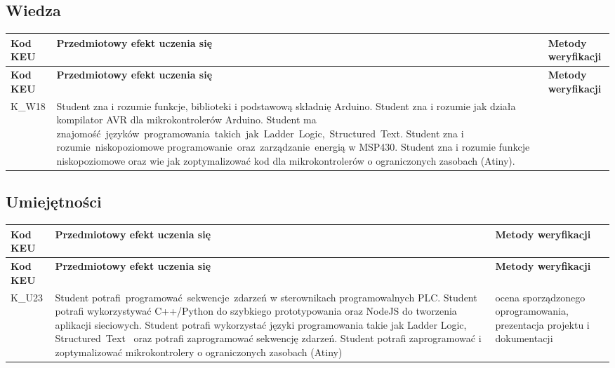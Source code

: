 \documentclass[12pt, a4paper]{article}
\newcommand{\thdrule}{\noalign{\global\setlength{\extrarowheight}{0pt}}}
\newcommand{\thdend}{\noalign{\global\setlength{\extrarowheight}{3pt}}}
\begin{document}
\subsection*{Wiedza}
{\scriptsize
\begin{longtable}{m{1.6cm}m{9.0cm}m{4.2cm}}
\thdrule\toprule
\rowcolor{pjatkRed} {\color{white}\footnotesize\textbf{\vphantom{Ag}Kod KEU}} & {\color{white}\footnotesize\textbf{\vphantom{Ag}Przedmiotowy efekt uczenia się}} & {\color{white}\footnotesize\textbf{\vphantom{Ag}Metody weryfikacji}} \\
\midrule\thdend
\endfirsthead
\thdrule\toprule
\rowcolor{pjatkRed} {\color{white}\footnotesize\textbf{\vphantom{Ag}Kod KEU}} & {\color{white}\footnotesize\textbf{\vphantom{Ag}Przedmiotowy efekt uczenia się}} & {\color{white}\footnotesize\textbf{\vphantom{Ag}Metody weryfikacji}} \\
\midrule\thdend
\endhead
  \rowcolor{tableRowLight} K\_W18 & Student zna i rozumie funkcje, biblioteki i podstawową składnię Arduino.  Student zna i rozumie jak działa kompilator AVR dla mikrokontrolerów Arduino. Student ma znajomość języków programowania takich jak Ladder Logic, Structured Text. Student zna i rozumie niskopoziomowe programowanie oraz zarządzanie energią w MSP430. Student zna i rozumie funkcje niskopoziomowe oraz wie jak zoptymalizować kod dla mikrokontrolerów o ograniczonych zasobach (Atiny). &  \\
\bottomrule
\end{longtable}}

\subsection*{Umiejętności}
{\scriptsize
\begin{longtable}{m{1.6cm}m{9.0cm}m{4.2cm}}
\thdrule\toprule
\rowcolor{pjatkRed} {\color{white}\footnotesize\textbf{\vphantom{Ag}Kod KEU}} & {\color{white}\footnotesize\textbf{\vphantom{Ag}Przedmiotowy efekt uczenia się}} & {\color{white}\footnotesize\textbf{\vphantom{Ag}Metody weryfikacji}} \\
\midrule\thdend
\endfirsthead
\thdrule\toprule
\rowcolor{pjatkRed} {\color{white}\footnotesize\textbf{\vphantom{Ag}Kod KEU}} & {\color{white}\footnotesize\textbf{\vphantom{Ag}Przedmiotowy efekt uczenia się}} & {\color{white}\footnotesize\textbf{\vphantom{Ag}Metody weryfikacji}} \\
\midrule\thdend
\endhead
  \rowcolor{tableRowLight} K\_U23 & Student potrafi programować sekwencje zdarzeń w sterownikach programowalnych PLC. Student potrafi wykorzystywać C++/Python do szybkiego prototypowania oraz NodeJS do tworzenia aplikacji sieciowych. Student potrafi wykorzystać języki programowania takie jak Ladder Logic, Structured Text  oraz potrafi zaprogramować sekwencję zdarzeń.  Student potrafi zaprogramować i zoptymalizować mikrokontrolery o ograniczonych zasobach (Atiny) & ocena sporządzonego oprogramowania, prezentacja projektu i dokumentacji \\
\bottomrule
\end{longtable}}
\end{document}
